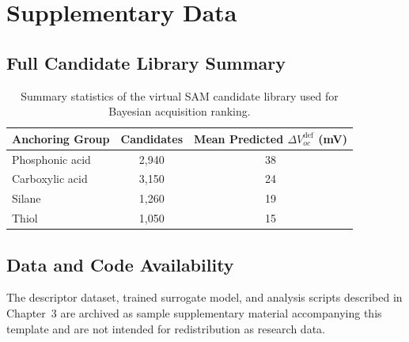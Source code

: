 \documentclass[12pt,a4paper,oneside]{report}
\begin{document}
\appendix
\chapter{Supplementary Data}

\section{Full Candidate Library Summary}

\begin{table}[htbp]
\centering
\caption{Summary statistics of the virtual SAM candidate library used for
Bayesian acquisition ranking.}
\label{tab:appendix}
\begin{tabular}{@{}lcc@{}}
\toprule
\textbf{Anchoring Group} & \textbf{Candidates} & \textbf{Mean Predicted $\Delta V_{oc}^{\text{def}}$ (mV)} \\
\midrule
Phosphonic acid & 2{,}940 & 38 \\
Carboxylic acid & 3{,}150 & 24 \\
Silane & 1{,}260 & 19 \\
Thiol & 1{,}050 & 15 \\
\bottomrule
\end{tabular}
\end{table}

\section{Data and Code Availability}

The descriptor dataset, trained surrogate model, and analysis scripts
described in Chapter~3 are archived as sample supplementary material
accompanying this template and are not intended for redistribution as
research data.
\end{document}
